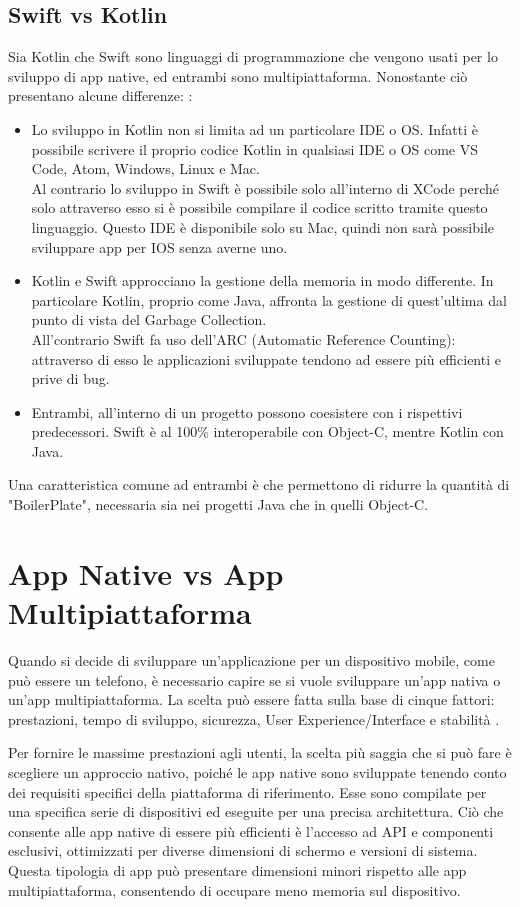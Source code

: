\subsection{Swift vs Kotlin}
Sia Kotlin che Swift sono linguaggi di programmazione che vengono usati per lo sviluppo di app native, ed entrambi sono multipiattaforma.
Nonostante ci\`o presentano alcune differenze: \cite{Swift:Kotlin}:
\begin{itemize}
      \item Lo sviluppo in Kotlin non si limita ad un particolare IDE o OS. Infatti \`e possibile scrivere il proprio codice Kotlin in qualsiasi IDE o OS come VS Code, Atom, Windows, Linux e Mac.\\
            Al contrario lo sviluppo in Swift \`e possibile solo all'interno di XCode perch\'e solo attraverso esso si \`e possibile compilare il codice scritto tramite questo linguaggio.
            Questo IDE \`e disponibile solo su Mac, quindi non sar\`a possibile sviluppare app per IOS senza averne uno.
      \item Kotlin e Swift approcciano la gestione della memoria in modo differente. In particolare Kotlin, proprio come Java, affronta la gestione di quest'ultima dal punto di vista del Garbage Collection.\\
            All'contrario Swift fa uso dell'ARC {}(Automatic Reference Counting): attraverso di esso le applicazioni sviluppate tendono ad essere pi\`u efficienti e prive di bug.
      \item Entrambi, all'interno di un progetto possono coesistere con i rispettivi predecessori. Swift \`e al 100\% interoperabile con Object-C, mentre Kotlin con Java.
\end{itemize}
Una caratteristica comune ad entrambi \`e che permettono di ridurre la quantit\`a di "BoilerPlate", necessaria sia nei progetti Java che in quelli Object-C.

\section{App Native vs App Multipiattaforma}
Quando si decide di sviluppare un'applicazione per un dispositivo mobile, come pu\`o essere un telefono, \`e necessario capire se si vuole sviluppare un'app nativa o un'app multipiattaforma.
La scelta pu\`o essere fatta sulla base di cinque fattori: prestazioni, tempo di sviluppo, sicurezza, User Experience/Interface e stabilit\`a \cite{NativeApp:MultiplatformApp}.

Per fornire le massime prestazioni agli utenti, la scelta pi\`u saggia che si pu\`o fare \`e scegliere un approccio nativo, poich\'e
le app native sono sviluppate tenendo conto dei requisiti specifici della piattaforma di riferimento. Esse sono compilate per una specifica serie di dispositivi ed
eseguite per una precisa architettura. Ci\`o che consente alle app native di essere pi\`u efficienti \`e l'accesso ad API e componenti esclusivi, ottimizzati per diverse dimensioni di schermo e versioni di sistema.
Questa tipologia di app pu\`o presentare dimensioni minori rispetto alle app multipiattaforma, consentendo di occupare meno memoria sul dispositivo.

